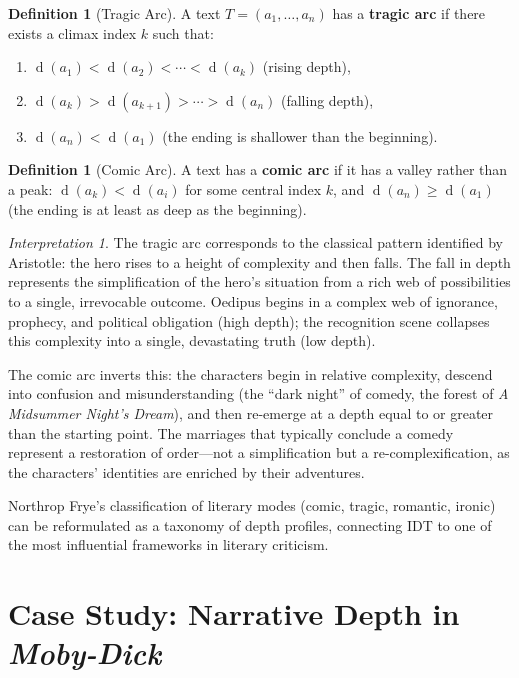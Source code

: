 \documentclass[11pt,openany]{book}
\theoremstyle{definition}
\newtheorem{definition}[axiom]{Definition}
\theoremstyle{plain}
\theoremstyle{remark}
\newtheorem{interpretation}[axiom]{Interpretation}
\newcommand{\depth}{\operatorname{d}}       %
\begin{document}
\begin{definition}[Tragic Arc]
A text $T = (a_1, \ldots, a_n)$ has a \textbf{tragic arc} if there exists a climax index $k$ such that:
\begin{enumerate}
\item $\depth(a_1) < \depth(a_2) < \cdots < \depth(a_k)$ (rising depth),
\item $\depth(a_k) > \depth(a_{k+1}) > \cdots > \depth(a_n)$ (falling depth),
\item $\depth(a_n) < \depth(a_1)$ (the ending is shallower than the beginning).
\end{enumerate}
\end{definition}

\begin{definition}[Comic Arc]
A text has a \textbf{comic arc} if it has a valley rather than a peak: $\depth(a_k) < \depth(a_i)$ for some central index $k$, and $\depth(a_n) \geq \depth(a_1)$ (the ending is at least as deep as the beginning).
\end{definition}

\begin{interpretation}
The tragic arc corresponds to the classical pattern identified by Aristotle: the hero rises to a height of complexity and then falls. The fall in depth represents the simplification of the hero's situation from a rich web of possibilities to a single, irrevocable outcome. Oedipus begins in a complex web of ignorance, prophecy, and political obligation (high depth); the recognition scene collapses this complexity into a single, devastating truth (low depth).

The comic arc inverts this: the characters begin in relative complexity, descend into confusion and misunderstanding (the ``dark night'' of comedy, the forest of \emph{A Midsummer Night's Dream}), and then re-emerge at a depth equal to or greater than the starting point. The marriages that typically conclude a comedy represent a restoration of order---not a simplification but a re-complexification, as the characters' identities are enriched by their adventures.

Northrop Frye's classification of literary modes (comic, tragic, romantic, ironic) can be reformulated as a taxonomy of depth profiles, connecting IDT to one of the most influential frameworks in literary criticism.
\end{interpretation}

\section{Case Study: Narrative Depth in \emph{Moby-Dick}}
\end{document}
